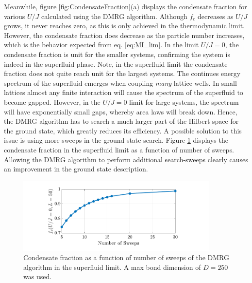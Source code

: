 Meanwhile, figure \ref{fig:CondensateFraction}(a) displays the condensate fraction for various $U/J$ calculated using the DMRG algorithm. Although $f_c$ decreases as $U/J$ grows, it never reaches zero, as this is only achieved in the thermodynamic limit. However, the condensate fraction does decrease as the particle number increases, which is the behavior expected from eq. \eqref{eq:MI_lim}.
In the limit $U/J = 0$, the condensate fraction is unit for the smaller systems, confirming the system is indeed in the superfluid phase. 
Note, in the superfluid limit the condensate fraction does not quite reach unit for the largest systems. 
The continues energy spectrum of the superfluid emerges when coupling \textit{many} lattice wells.
In small lattices almost any finite interaction will cause the spectrum of the superfluid to become gapped. However, in the $U/J = 0$ limit for large systems, the spectrum will have exponentially small gaps, whereby area laws will break down. Hence, the DMRG algorithm has to search a much larger part of the Hilbert space for the ground state, which greatly reduces its efficiency. A possible solution to this issue is using more sweeps in the ground state search. Figure \ref{fig:sweepdependence} displays the condensate fraction in the superfluid limit as a function of number of sweeps. Allowing the DMRG algorithm to perform additional search-sweeps clearly causes an improvement in the ground state description.\\ 
\begin{figure}[h!]
    \centering
    \includegraphics[width=0.9\textwidth]{Figures/CFsweeps.pdf}
    \caption{Condensate fraction as a function of number of sweeps of the DMRG algorithm in the superfluid limit. A max bond dimension of $D = 250$ was used.}
    \label{fig:sweepdependence}
\end{figure}

